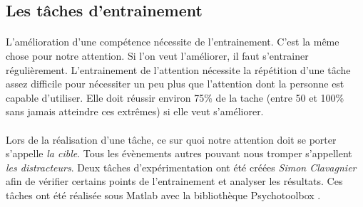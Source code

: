 





\newpage
\subsection{Les tâches d'entrainement}
\label{TrainingSection}

\paragraph{}L'amélioration d'une compétence nécessite de l'entrainement. C'est la même chose pour notre attention. Si l'on veut l'améliorer, il faut s'entrainer régulièrement.
L'entrainement de l'attention nécessite la répétition d'une tâche assez difficile pour nécessiter un peu plus que l'attention dont la personne est capable d'utiliser. Elle doit réussir
environ 75\% de la tache (entre 50 et 100\% sans jamais atteindre ces extrêmes) si elle veut s'améliorer.

\paragraph{}Lors de la réalisation d'une tâche, ce sur quoi notre attention doit se porter s'appelle \emph{la cible}. Tous les évènements autres pouvant nous tromper s'appellent
\emph{les distracteurs}. Deux tâches d'expérimentation ont été créées \emph{Simon Clavagnier} afin de vérifier certains points de l'entrainement et analyser les résultats. Ces tâches
ont été réalisée sous \gls{Matlab} avec la bibliothèque \gls{Psychotoolbox} .




 \newpage




\newpage